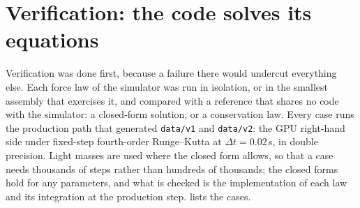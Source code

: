 \section{Verification: the code solves its equations}
\label{sec:critique_verification}

Verification was done first, because a failure there would undercut everything else. Each force law of the simulator was run in isolation, or in the smallest assembly that exercises it, and compared with a reference that shares no code with the simulator: a closed-form solution, or a conservation law. Every case runs the production path that generated \texttt{data/v1} and \texttt{data/v2}: the GPU right-hand side under fixed-step fourth-order Runge--Kutta at $\Delta t = 0.02$\,s, in double precision. Light masses are used where the closed form allows, so that a case needs thousands of steps rather than hundreds of thousands; the closed forms hold for any parameters, and what is checked is the implementation of each law and its integration at the production step.  lists the cases.

